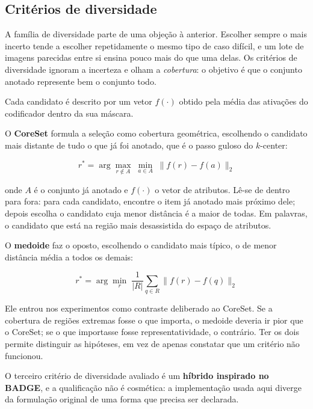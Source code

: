 \subsection{Critérios de diversidade}
\label{sec_crit_diversidade}

A família de diversidade parte de uma objeção à anterior. Escolher sempre o mais incerto tende a escolher repetidamente o mesmo tipo de caso difícil, e um lote de imagens parecidas entre si ensina pouco mais do que uma delas. Os critérios de diversidade ignoram a incerteza e olham a \emph{cobertura}: o objetivo é que o conjunto anotado represente bem o conjunto todo.

Cada candidato é descrito por um vetor $f(\cdot)$ obtido pela média das ativações do codificador dentro da sua máscara.

O \textbf{CoreSet} formula a seleção como cobertura geométrica, escolhendo o candidato mais distante de tudo o que já foi anotado, que é o passo guloso do $k$-center:

\begin{equation}
r^{\ast} = \arg\max_{r \notin A} \; \min_{a \in A} \; \lVert f(r) - f(a) \rVert_2
\label{eq_coreset}
\end{equation}

onde $A$ é o conjunto já anotado e $f(\cdot)$ o vetor de atributos. Lê-se de dentro para fora: para cada candidato, encontre o item já anotado mais próximo dele; depois escolha o candidato cuja menor distância é a maior de todas. Em palavras, o candidato que está na região mais desassistida do espaço de atributos.

O \textbf{medoide} faz o oposto, escolhendo o candidato mais típico, o de menor distância média a todos os demais:

\begin{equation}
r^{\ast} = \arg\min_{r} \; \frac{1}{|R|}\sum_{q \in R} \lVert f(r) - f(q) \rVert_2
\label{eq_medoide}
\end{equation}

Ele entrou nos experimentos como contraste deliberado ao CoreSet. Se a cobertura de regiões extremas fosse o que importa, o medoide deveria ir pior que o CoreSet; se o que importasse fosse representatividade, o contrário. Ter os dois permite distinguir as hipóteses, em vez de apenas constatar que um critério não funcionou.

O terceiro critério de diversidade avaliado é um \textbf{híbrido inspirado no \ac{BADGE}}, e a qualificação não é cosmética: a implementação usada aqui diverge da formulação original de uma forma que precisa ser declarada.

